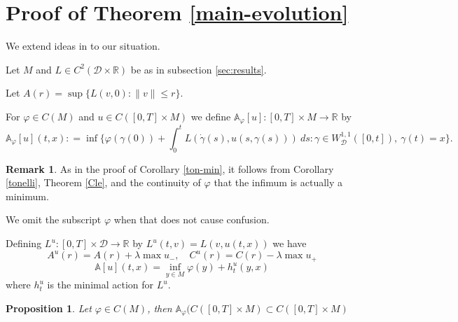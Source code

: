 \documentclass[12pt]{amsart}
\theoremstyle{plain}
\newtheorem{proposition}{Proposition}
\theoremstyle{definition}
\newtheorem{remark}{Remark}
\newcommand{\A}{\mathbb A}
\newcommand{\R}{\mathbb R}
\newcommand{\cD}{\mathcal D}
\newcommand{\cW}{W^{1,1}}
\newcommand{\cWD}{\cW_\cD}
\newcommand{\fui}{\varphi}
\newcommand{\ga}{\gamma}
\newcommand{\la}{\lambda}
\newcommand{\dga}{\dot\gamma}
\newcommand{\Lip}{\operatorname{Lip}}
\begin{document}
  \section{Proof of Theorem \ref{main-evolution}}
  \label{sec:contact-lagrangians}
 We extend ideas in \cite{SWY} to our situation.
  
Let $M$ and $L\in C^2(\cD\times\R)$ be as in subsection
\ref{sec:results}.

Let $A(r)=\sup\{L(v,0):\|v\|\le r\}$.

For $\fui\in C(M)$ and $u\in C([0,T]\times M)$ we define
$\A_\fui[u]:[0,T]\times M\to\R$ by
  \[\A_\fui[u](t,x):
    =\inf\{\fui(\ga(0))+\int_0^tL(\dga(s),u(s,\ga(s)))\ ds:\ga\in\cWD([0,t]),\ \ga(t)=x\}.\]
  \begin{remark}
      As in the proof of Corollary \ref{ton-min}, it follows from Corollary \ref{tonelli},
  Theorem \ref {Cle}, and the continuity of $\fui$ that the infimum is actually a minimum.
\end{remark}
  We omit the subscript $\fui$ when that does not cause confusion.
  
  Defining  $L^u:[0,T]\times\cD\to\R$ by $L^u(t,v)=L(v,u(t,x))$ we have 
  \[A^u(r)=A(r)+\la\max u_-,\quad C^u(r)=C(r)-\la\max u_+\]
  \[\A[u](t,x)=\inf_{y\in M}\fui(y)+h^u_t(y,x)\]
where $h_t^u$ is the minimal action for $L^u$.

\begin{proposition}
  Let $\fui\in C(M)$, then $\A_\fui(C([0,T]\times M)\subset C([0,T]\times M)$ 
\end{proposition}
\end{document}
